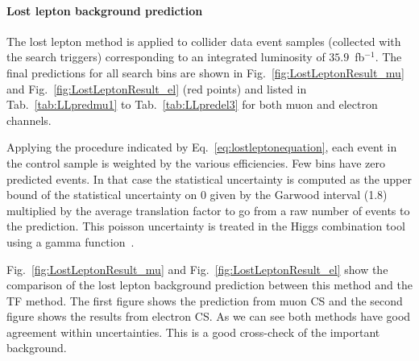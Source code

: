 \paragraph{Lost lepton background prediction}

The lost lepton method is applied to collider data event samples (collected with the search triggers) corresponding to an integrated
luminosity of $35.9$~fb$^{-1}$. 
The final predictions for all search bins are shown in Fig.~\ref{fig:LostLeptonResult_mu} and Fig.~\ref{fig:LostLeptonResult_el} (red points) and listed in Tab.~\ref{tab:LLpredmu1} to Tab.~\ref{tab:LLpredel3} for both muon and electron channels.

Applying the procedure indicated by Eq.~\ref{eq:lostleptonequation}, each event in the control sample is weighted by the various efficiencies. 
Few bins have zero predicted events.
In that case the statistical uncertainty is computed as the upper bound of the statistical uncertainty on 0 given by the Garwood interval (1.8) multiplied by the average translation factor to go from a raw number of events to the prediction. 
This poisson uncertainty is treated in the Higgs combination tool using a gamma function~\cite{HiggsCombine,cms-note-2011-005}.

Fig.~\ref{fig:LostLeptonResult_mu} and Fig.~\ref{fig:LostLeptonResult_el} show the comparison of the lost lepton background prediction between this method and the TF method.
The first figure shows the prediction from muon CS and the second figure shows the results from electron CS. As we can see both methods have good agreement within uncertainties. This is a good cross-check of the important background.

